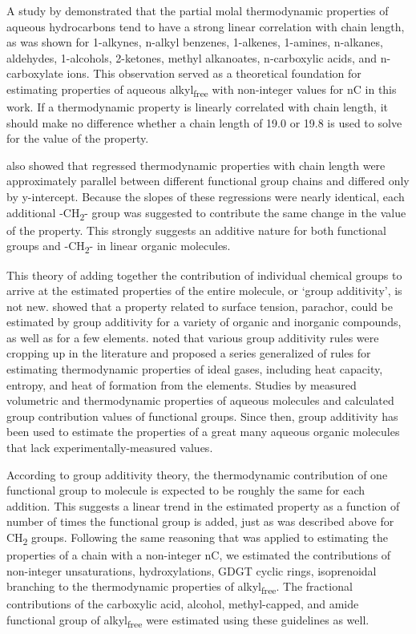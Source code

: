 A study by \cite{shock1990calculation} demonstrated that the partial molal thermodynamic properties of aqueous hydrocarbons tend to have a strong linear correlation with chain length, as was shown for 1-alkynes, n-alkyl benzenes, 1-alkenes, 1-amines, n-alkanes, aldehydes, 1-alcohols, 2-ketones, methyl alkanoates, n-carboxylic acids, and n-carboxylate ions. This observation served as a theoretical foundation for estimating properties of aqueous alkyl\textsubscript{free} with non-integer values for nC in this work. If a thermodynamic property is linearly correlated with chain length, it should make no difference whether a chain length of 19.0 or 19.8 is used to solve for the value of the property.

\cite{shock1990calculation} also showed that regressed thermodynamic properties with chain length were approximately parallel between different functional group chains and differed only by y-intercept. Because the slopes of these regressions were nearly identical, each additional -CH\textsubscript{2}- group was suggested to contribute the same change in the value of the property. This strongly suggests an additive nature for both functional groups and -CH\textsubscript{2}- in linear organic molecules.

This theory of adding together the contribution of individual chemical groups to arrive at the estimated properties of the entire molecule, or `group additivity', is not new. \cite{sugden1924cxlii} showed that a property related to surface tension, parachor, could be estimated by group additivity for a variety of organic and inorganic compounds, as well as for a few elements. \cite{benson1958additivity} noted that various group additivity rules were cropping up in the literature and proposed a series generalized of rules for estimating thermodynamic properties of ideal gases, including heat capacity, entropy, and heat of formation from the elements. Studies by \cite{cabani1981group, cabani1977volume1, cabani1977volume2} measured volumetric and thermodynamic properties of aqueous molecules and calculated group contribution values of functional groups. Since then, group additivity has been used to estimate the properties of a great many aqueous organic molecules that lack experimentally-measured values.

According to group additivity theory, the thermodynamic contribution of one functional group to molecule is expected to be roughly the same for each addition. This suggests a linear trend in the estimated property as a function of number of times the functional group is added, just as was described above for CH\textsubscript{2} groups. Following the same reasoning that was applied to estimating the properties of a chain with a non-integer nC, we estimated the contributions of non-integer unsaturations, hydroxylations, GDGT cyclic rings, isoprenoidal branching to the thermodynamic properties of alkyl\textsubscript{free}. The fractional contributions of the carboxylic acid, alcohol, methyl-capped, and amide functional group of alkyl\textsubscript{free} were estimated using these guidelines as well.

